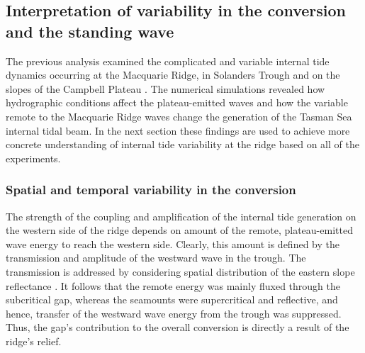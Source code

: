\documentclass[12pt]{article}
\begin{document}
\subsection{Interpretation of variability in the conversion and the standing wave}
The previous analysis examined the complicated and variable internal tide dynamics occurring at the 
Macquarie Ridge, in Solanders Trough and on the slopes of the Campbell Plateau 
. 
The 
numerical 
simulations revealed how hydrographic conditions affect the plateau-emitted waves and how 
the variable remote to the Macquarie Ridge waves change the generation of the Tasman Sea 
internal tidal beam. In the next section these findings are used to achieve more concrete 
understanding of internal tide variability at the ridge based on all of the experiments.

\subsubsection{Spatial and temporal variability in the conversion}
\label{C3.sec:spat_conv}
The strength of the coupling and amplification of the internal tide generation on the western side 
of 
the 
ridge  
depends on amount of the remote, plateau-emitted wave energy to reach the western side. Clearly, 
this amount is defined by the transmission and amplitude of the westward wave in the 
trough. The transmission is addressed by considering spatial distribution of the eastern slope 
reflectance 
. It follows that the remote energy was mainly fluxed through the 
subcritical gap, 
whereas the seamounts were supercritical and reflective, and hence, transfer of the 
westward wave energy from the trough was suppressed. Thus, the gap's contribution to the overall 
conversion is directly a result of the ridge's relief.\\
\end{document}
